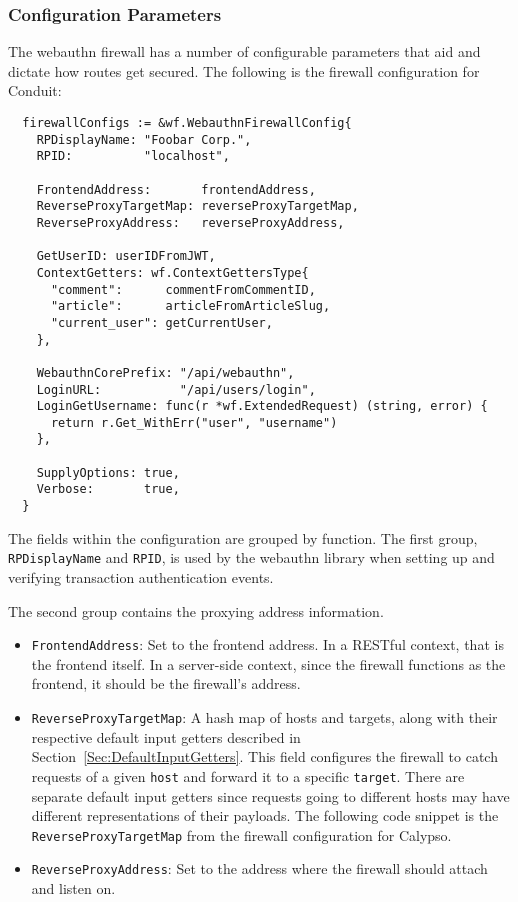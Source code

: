 \subsubsection{Configuration Parameters}

The webauthn firewall has a number of configurable parameters that aid and dictate how routes get secured. The following is the firewall configuration for Conduit:

\begin{lstlisting}
  firewallConfigs := &wf.WebauthnFirewallConfig{
    RPDisplayName: "Foobar Corp.",
    RPID:          "localhost",

    FrontendAddress:       frontendAddress,
    ReverseProxyTargetMap: reverseProxyTargetMap,
    ReverseProxyAddress:   reverseProxyAddress,

    GetUserID: userIDFromJWT,
    ContextGetters: wf.ContextGettersType{
      "comment":      commentFromCommentID,
      "article":      articleFromArticleSlug,
      "current_user": getCurrentUser,
    },

    WebauthnCorePrefix: "/api/webauthn",
    LoginURL:           "/api/users/login",
    LoginGetUsername: func(r *wf.ExtendedRequest) (string, error) {
      return r.Get_WithErr("user", "username")
    },

    SupplyOptions: true,
    Verbose:       true,
  }
\end{lstlisting}

The fields within the configuration are grouped by function. The first group, \lstinline{RPDisplayName} and \lstinline{RPID}, is used by the webauthn library when setting up and verifying transaction authentication events. 

\noindent The second group contains the proxying address information. 

\begin{itemize}[nosep]
\item \lstinline{FrontendAddress}: Set to the frontend address. In a RESTful context, that is the frontend itself. In a server-side context, since the firewall functions as the frontend, it should be the firewall's address.

\item \lstinline{ReverseProxyTargetMap}: A hash map of hosts and targets, along with their respective default input getters described in Section~\ref{Sec:DefaultInputGetters}. This field configures the firewall to catch requests of a given \lstinline{host} and forward it to a specific \lstinline{target}. There are separate default input getters since requests going to different hosts may have different representations of their payloads. The following code snippet is the \lstinline{ReverseProxyTargetMap} from the firewall configuration for Calypso.

\item \lstinline{ReverseProxyAddress}: Set to the address where the firewall should attach and listen on.
\end{itemize}

